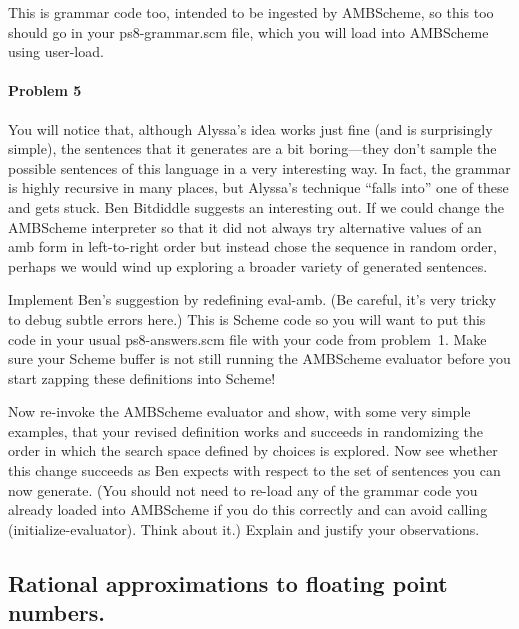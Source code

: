 This is grammar code too, intended to be ingested by {\sc AMBScheme}, so this
too should go in your {\cf ps8-grammar.scm} file, which you will load into {\sc
AMBScheme} using {\cf user-load}.

\paragraph{Problem 5}

You will notice that, although Alyssa's idea works just fine (and is
surprisingly simple), the sentences that it generates are a bit boring---they
don't sample the possible sentences of this language in a very interesting
way.  In fact, the grammar is highly recursive in many places, but Alyssa's
technique ``falls into'' one of these and gets stuck.  Ben Bitdiddle suggests an
interesting out.  If we could change the {\sc AMBScheme} interpreter so that it did
not always try alternative values of an {\cf amb} form in left-to-right order
but instead chose the sequence in random order, perhaps we would wind up
exploring a broader variety of generated sentences.

Implement Ben's suggestion by redefining {\cf eval-amb}.  (Be careful, it's
very tricky to debug subtle errors here.) This is {\sc Scheme} code so you will
want to put this code in your usual {\cf ps8-answers.scm} file with your code
from problem~1.  Make sure your {\sc Scheme} buffer is not still running the
{\sc AMBScheme} evaluator before you start zapping these definitions into {\sc
Scheme}!

Now re-invoke the {\sc AMBScheme} evaluator and show, with some very simple
examples, that your revised definition works and succeeds in randomizing the
order in which the search space defined by choices is explored.  Now see
whether this change succeeds as Ben expects with respect to the set of
sentences you can now generate.  (You should not need to re-load any of the
grammar code you already loaded into {\sc AMBScheme} if you do this correctly
and can avoid calling {\cf (initialize-evaluator)}.  Think about it.) Explain
and justify your observations.




\subsection{Rational approximations to floating point numbers.}

